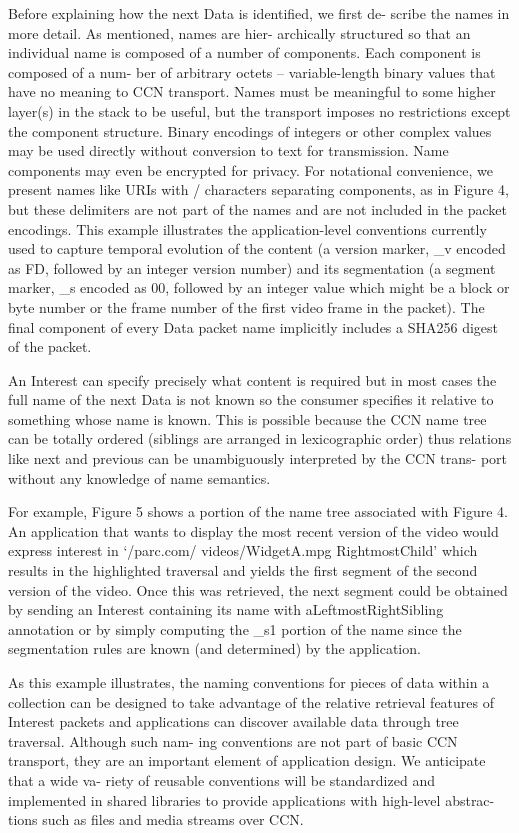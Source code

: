 \par
Before explaining how the next Data is identified, we first de- scribe the names in more detail. As mentioned, names are hier- archically structured so that an individual name is composed of a number of components. Each component is composed of a num- ber of arbitrary octets – variable-length binary values that have no meaning to CCN transport. Names must be meaningful to some higher layer(s) in the stack to be useful, but the transport imposes no restrictions except the component structure. Binary encodings of integers or other complex values may be used directly without conversion to text for transmission. Name components may even be encrypted for privacy. For notational convenience, we present names like URIs with / characters separating components, as in Figure 4, but these delimiters are not part of the names and are not included in the packet encodings. This example illustrates the application-level conventions currently used to capture temporal evolution of the content (a version marker, \_v encoded as FD, followed by an integer version number) and its segmentation (a segment marker, \_s encoded as 00, followed by an integer value which might be a block or byte number or the frame number of the first video frame in the packet). The final component of every Data packet name implicitly includes a SHA256 digest of the packet.
\par
An Interest can specify precisely what content is required but in most cases the full name of the next Data is not known so the consumer specifies it relative to something whose name is known. This is possible because the CCN name tree can be totally ordered (siblings are arranged in lexicographic order) thus relations like next and previous can be unambiguously interpreted by the CCN trans- port without any knowledge of name semantics.
\par
For example, Figure 5 shows a portion of the name tree associated with Figure 4. An application that wants to display the most recent version of the video would express interest in ‘/parc.com/ videos/WidgetA.mpg RightmostChild’ which results in the highlighted traversal and yields the first segment of the second version of the video. Once this was retrieved, the next segment could be obtained by sending an Interest containing its name with aLeftmostRightSibling annotation or by simply computing the \_s1 portion of the name since the segmentation rules are known (and determined) by the application.
\par
As this example illustrates, the naming conventions for pieces of data within a collection can be designed to take advantage of the relative retrieval features of Interest packets and applications can discover available data through tree traversal. Although such nam- ing conventions are not part of basic CCN transport, they are an important element of application design. We anticipate that a wide va- riety of reusable conventions will be standardized and implemented in shared libraries to provide applications with high-level abstrac- tions such as files and media streams over CCN.
